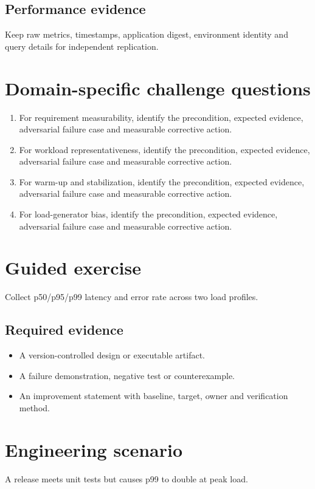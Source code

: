 \documentclass[10pt,letterpaper]{article}
\begin{document}
\subsection{Performance evidence}
Keep raw metrics, timestamps, application digest, environment identity and query details for independent replication.

\section{Domain-specific challenge questions}
\begin{enumerate}
\item For requirement measurability, identify the precondition, expected evidence, adversarial failure case and measurable corrective action.
\item For workload representativeness, identify the precondition, expected evidence, adversarial failure case and measurable corrective action.
\item For warm-up and stabilization, identify the precondition, expected evidence, adversarial failure case and measurable corrective action.
\item For load-generator bias, identify the precondition, expected evidence, adversarial failure case and measurable corrective action.
\end{enumerate}
\section{Guided exercise}
Collect p50/p95/p99 latency and error rate across two load profiles.

\subsection{Required evidence}
\begin{itemize}
\item A version-controlled design or executable artifact.
\item A failure demonstration, negative test or counterexample.
\item An improvement statement with baseline, target, owner and verification method.
\end{itemize}


\section{Engineering scenario}
A release meets unit tests but causes p99 to double at peak load.
\end{document}
